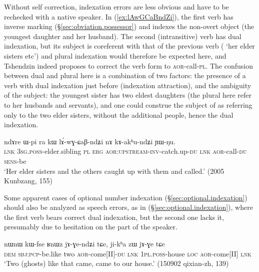 Without self correction, indexation errors are less obvious and have to be rechecked with a native speaker. In (\ref{ex:lAwGCaBndZi}), the first verb  has inverse marking (§\ref{sec:obviation.possessor}) and indexes the non-overt object (the youngest daughter and her husband). The second (intransitive) verb has dual indexation, but its subject is coreferent with that of the previous verb ( `her elder sisters etc') and plural indexation would therefore be expected here, and Tshendzin indeed proposes to correct the verb form to  \textsc{aor}-call-\textsc{pl}. The confusion between dual and plural here is a combination of two factors: the presence of a verb with dual indexation just before (indexation attraction), and the ambiguity of the subject: the youngest sister has two eldest daughters (the plural here refer to her husbands and servants), and one could construe the subject of  as referring only to the two elder sisters, without the additional people, hence the dual indexation.

\begin{exe}
\ex \label{ex:lAwGCaBndZi}
\gll  ndɤre ɯ-pi ra kɯ lɤ́-wɣ-ɕaβ-ndʑi nɤ kɤ-akʰu-ndʑi ɲɯ-ŋu. \\
\textsc{lnk} \textsc{3sg}.\textsc{poss}-elder.sibling \textsc{pl} \textsc{erg} \textsc{aor}:\textsc{upstream}-\textsc{inv}-catch.up-\textsc{du} \textsc{lnk} \textsc{aor}-call-\textsc{du} \textsc{sens}-be \\
\glt `Her elder sisters and the others caught up with them and called.' (2005 Kunbzang, 155)
\end{exe} 

Some apparent cases of optional number indexation (§\ref{sec:optional.indexation}) should also be analyzed as speech errors, as in (§\ref{sec:optional.indexation}), where the first verb  bears correct dual indexation, but the second one lacks it, presumably due to hesitation on the part of the speaker.

\begin{exe}
\ex \label{ex:jAGendZi.du}
\gll   nɯnɯ kɯ-fse ʁnɯz jɤ-ɣe-ndʑi tɕe,  ji-kʰa zɯ jɤ-ɣe tɕe \\
\textsc{dem} \textsc{sbj}:\textsc{pcp}-be.like two \textsc{aor}-come[II]-\textsc{du} \textsc{lnk}  \textsc{1pl}.\textsc{poss}-house \textsc{loc} \textsc{aor}-come[II] \textsc{lnk} \\
\glt `Two (ghosts) like that came, came to our house.' (150902 qixian-zh, 139)
\end{exe} 

